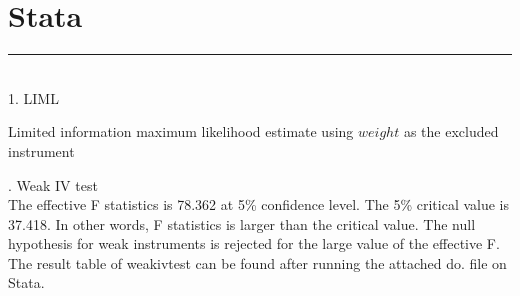 \documentclass{article}
\begin{document}
\section{Stata}
\noindent\rule{17cm}{0.4pt}
\smallskip
\\
1. LIML
\begin{table}[H]
    \centering
    
    \caption{Limited information maximum likelihood estimate using $weight$ as the excluded instrument}
    \label{tab:Q1_Stata}
\end{table}
\bigskip
{}. Weak IV test
\smallskip
\\ The effective F statistics is 78.362 at 5\% confidence level. The 5\% critical value is 37.418. In other words, F statistics is larger than the critical value. The null hypothesis for weak instruments is rejected for the large value of the effective F. 
\\ The result table of weakivtest can be found after running the attached do. file on Stata. 
\end{document}
